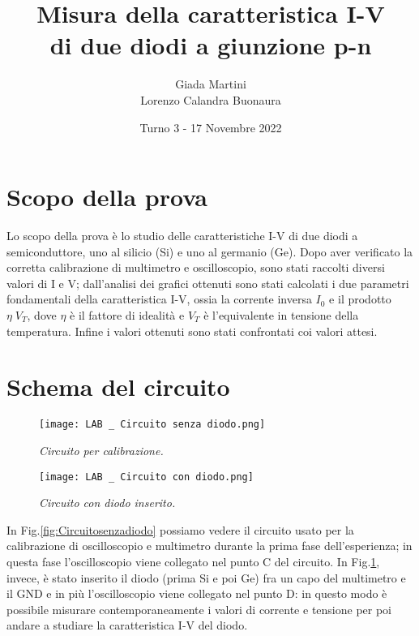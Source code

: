 \documentclass[a4paper, 11pt]{article}
\title{\textbf{Misura della caratteristica I-V \\ di due diodi a giunzione p-n}}
\author{Giada Martini \\ Lorenzo Calandra Buonaura}
\date{Turno 3 - 17 Novembre 2022}
\begin{document}
\maketitle

\section{Scopo della prova}
Lo scopo della prova è lo studio delle caratteristiche I-V di due diodi a semiconduttore, uno al silicio (Si) e uno al germanio (Ge). Dopo aver verificato la corretta calibrazione di multimetro e oscilloscopio, sono stati raccolti diversi valori di I e V; dall’analisi dei grafici ottenuti sono stati calcolati i due parametri fondamentali della caratteristica I-V, ossia la corrente inversa $I_0$ e il prodotto $\eta\;V_T$, dove $\eta$ è il fattore di idealità e $V_T$ è l’equivalente in tensione della temperatura. Infine i valori ottenuti sono stati confrontati coi valori attesi.

\section{Schema del circuito}
\begin{figure}[!ht]
  \centering
  \begin{minipage}[b]{0.51\textwidth}
    \texttt{[image: LAB \_ Circuito senza diodo.png]}
    \caption{\textit{Circuito per calibrazione.}}
    \label{fig:Circuitosenzadiodo}
  \end{minipage}
  \hfill
  \begin{minipage}[b]{0.48\textwidth}
    \texttt{[image: LAB \_ Circuito con diodo.png]}
    \caption{\textit{Circuito con diodo inserito.}}
    \label{fig:Circuito con diodo}
  \end{minipage}
\end{figure}
In Fig.\ref{fig:Circuitosenzadiodo} possiamo vedere il circuito usato per la calibrazione di oscilloscopio e multimetro durante la prima fase dell'esperienza; in questa fase l'oscilloscopio viene collegato nel punto C del circuito. In Fig.\ref{fig:Circuito con diodo}, invece, è stato inserito il diodo (prima Si e poi Ge) fra un capo del multimetro e il GND e in più l'oscilloscopio viene collegato nel punto D: in questo modo è possibile misurare contemporaneamente i valori di corrente e tensione per poi andare a studiare la caratteristica I-V del diodo.

\newpage
\end{document}
